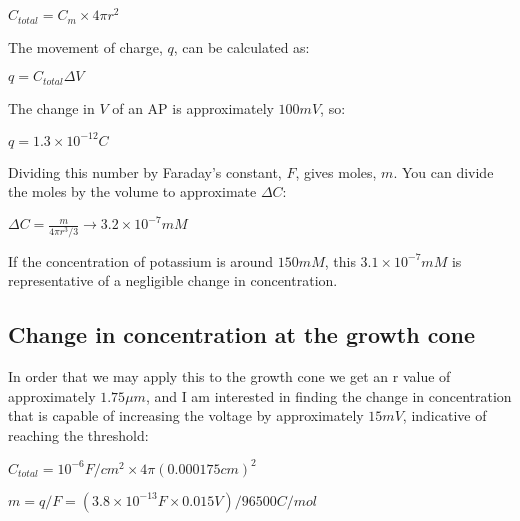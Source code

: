 \documentclass[12pt]{amsart}
\begin{document}
\begin{center}

    $C_{total} = C_m \times 4\pi r^2$

\end{center}

    The movement of charge, $q$, can be calculated as:
    
\begin{center}

    $q = C_{total}\Delta V$

\end{center}

    The change in $V$ of an AP is approximately $100mV$, so:

\begin{center}

    $q = 1.3 \times 10^{-12}C$

\end{center}

    Dividing this number by Faraday's constant, $F$, gives moles, $m$. You can divide the moles by the volume to approximate $\Delta C$:

\begin{center}

    $\Delta C = \frac{m}{4\pi r^3 /3} \rightarrow 3.2 \times 10^{-7} mM$
    
\end{center}

\bigskip

If the concentration of potassium is around $150mM$, this $3.1 \times 10^{-7} mM$ is representative of a negligible change in concentration. 

\subsection{Change in concentration at the growth cone} In order that we may apply this to the growth cone we get an r value of approximately $1.75 \mu m$, and I am interested in finding the change in concentration that is capable of increasing the voltage by approximately $15mV$, indicative of reaching the threshold: 

\bigskip

\begin{center}

    $C_{total} = 10^{-6} F/cm^2 \times 4\pi (0.000175cm)^2$

    $m = q/F = (3.8 \times 10^{-13}F \times 0.015V) / 96500 C/mol$

\end{center}
\end{document}
